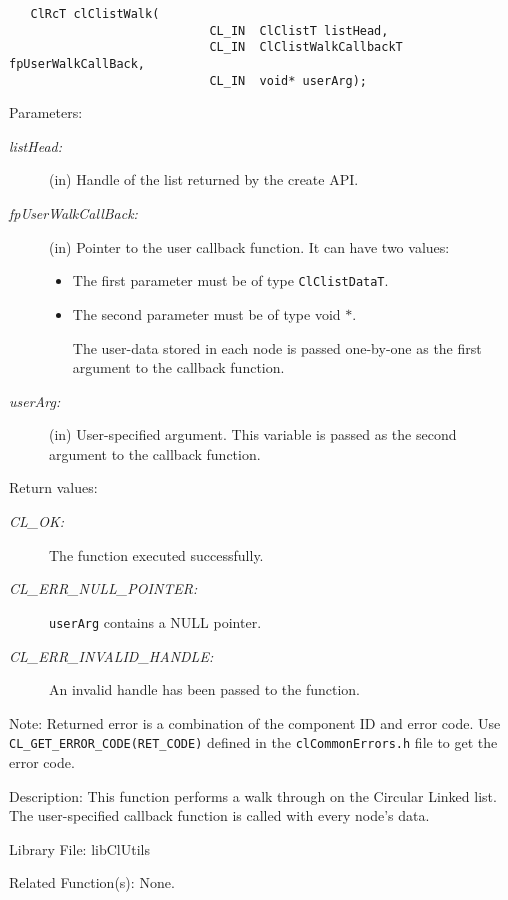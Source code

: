 \begin{flushleft}
\begin{Desc}
\footnotesize\begin{verbatim}   ClRcT clClistWalk(
                   			CL_IN  ClClistT listHead,
                   			CL_IN  ClClistWalkCallbackT fpUserWalkCallBack,
                   			CL_IN  void* userArg);
\end{verbatim}
\normalsize
\end{Desc}
\begin{Desc}
\item[Parameters:]
\begin{description}
\item[{\em list\-Head:}](in) Handle of the list returned by the create API.
\item[{\em fp\-User\-Walk\-Call\-Back:}](in) Pointer to the user callback function. It can have two values: \begin{itemize}
\item The first parameter must be of type {\tt{Cl\-Clist\-Data\-T}}. \item The second parameter must be of type void $\ast$. \par
 The user-data stored in each node is passed one-by-one as the first argument to the callback function.\end{itemize}
\item[{\em user\-Arg:}](in) User-specified argument. This variable is passed as the second argument to the callback function.\end{description}
\end{Desc}
\begin{Desc}
\item[Return values:]
\begin{description}
\item[{\em CL\_\-OK:}]The function executed successfully. 
\item[{\em CL\_\-ERR\_\-NULL\_\-POINTER:}]{\tt{userArg}} contains a NULL pointer. 
\item[{\em CL\_\-ERR\_\-INVALID\_\-HANDLE:}]An invalid handle has been passed to the function.\end{description}
\end{Desc}
\begin{Desc}
\item[Note:]Returned error is a combination of the component ID and error code. Use {\tt{CL\_\-GET\_\-ERROR\_\-CODE(RET\_\-CODE)}} defined in 
the {\tt{clCommonErrors.h}} file to get the error code.\end{Desc}
\begin{Desc}
\item[Description:]This function performs a walk through on the Circular Linked list. The user-specified callback function is called with every node's data.\end{Desc}
\begin{Desc}
\item[Library File:]lib\-Cl\-Utils\end{Desc}
\begin{Desc}
\item[Related Function(s):]None. \end{Desc}
\newpage


\end{flushleft}

